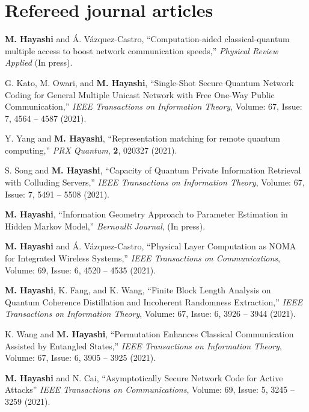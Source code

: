 \documentclass[a4paper,12pt,oneside]{article}
\begin{document}
\section{Refereed journal articles}
\begin{enumerate}


\textbf{M. Hayashi} and \'{A}. V\'{a}zquez-Castro,
``Computation-aided classical-quantum multiple access to boost network communication speeds,''
{\em Physical Review Applied}
(In press).

G. Kato, M. Owari, and \textbf{M. Hayashi},
``Single-Shot Secure Quantum Network Coding for General Multiple Unicast Network with Free One-Way Public Communication,''
{\em IEEE Transactions on Information Theory}, 
Volume: 67, Issue: 7, 4564 -- 4587 (2021).

Y. Yang and \textbf{M. Hayashi},
``Representation matching for remote quantum computing,''
{\em PRX Quantum}, {\bf 2}, 020327 (2021).

S. Song and \textbf{M. Hayashi},
``Capacity of Quantum Private Information Retrieval with Colluding Servers,''
{\em IEEE Transactions on Information Theory}, 
Volume: 67, Issue: 7, 5491 -- 5508 (2021).

\textbf{M. Hayashi},
``Information Geometry Approach to Parameter Estimation in Hidden Markov Model,''
{\em Bernoulli Journal},
(In press).

\textbf{M. Hayashi} and \'{A}. V\'{a}zquez-Castro,
``Physical Layer Computation as NOMA for Integrated Wireless Systems,''
{\em IEEE Transactions on Communications},
Volume: 69, Issue: 6, 4520 -- 4535 (2021).

\textbf{M. Hayashi}, K. Fang, and K. Wang,
``Finite Block Length Analysis on Quantum Coherence Distillation and Incoherent Randomness Extraction,''
{\em IEEE Transactions on Information Theory},
Volume: 67, Issue: 6, 3926 -- 3944 (2021).

K. Wang and \textbf{M. Hayashi},
``Permutation Enhances Classical Communication Assisted by Entangled States,''
{\em IEEE Transactions on Information Theory},
Volume: 67, Issue: 6, 3905 -- 3925 (2021).

\textbf{M. Hayashi} and N. Cai,
``Asymptotically Secure Network Code for Active Attacks''
{\em IEEE Transactions on Communications},
Volume: 69, Issue: 5, 3245 -- 3259 (2021).


\end{enumerate}
\end{document}
